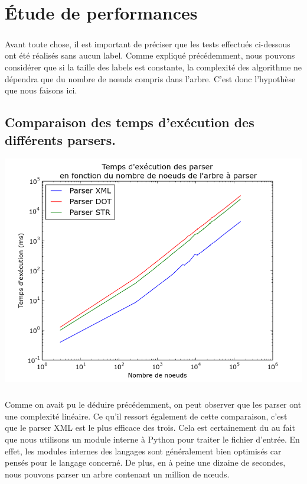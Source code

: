 \chapter{Étude de performances}

\paragraph{} Avant toute chose, il est important de préciser que les tests effectués ci-dessous ont été réalisés sans aucun label. Comme expliqué précédemment, nous pouvons considérer que si la taille des labels est constante, la complexité des algorithme ne dépendra que du nombre de n\oe uds compris dans l'arbre. C'est donc l'hypothèse que nous faisons ici.

	\section{Comparaison des temps d'exécution des différents parsers.}
	
\begin{center}

\includegraphics[width=\columnwidth]{execTimeParsers}

\end{center}

\paragraph{} Comme on avait pu le déduire précédemment, on peut observer que les parser ont une complexité linéaire. Ce qu'il ressort également de cette comparaison, c'est que le parser XML est le plus efficace des trois. Cela est certainement du au fait que nous utilisons un module interne à Python pour traiter le fichier d'entrée. En effet, les modules internes des langages sont généralement bien optimisés car pensés pour le langage concerné. De plus, en à peine une dizaine de secondes, nous pouvons parser un arbre contenant un million de n\oe uds.

